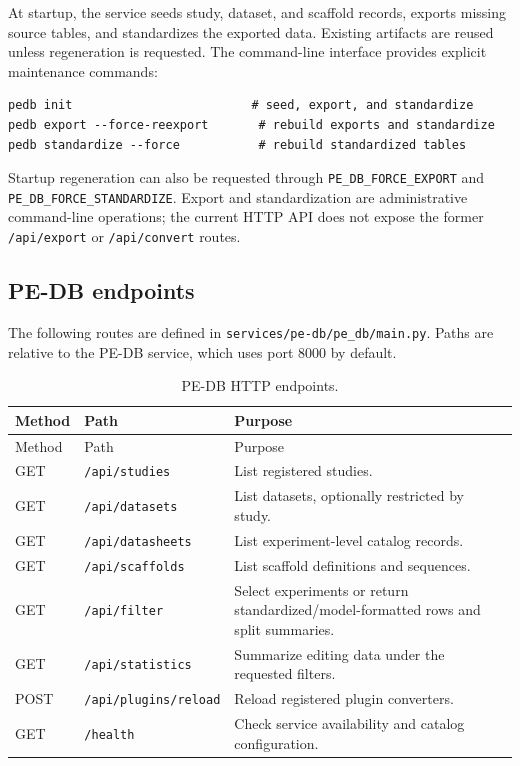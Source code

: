 \documentclass{article}
\begin{document}
At startup, the service seeds study, dataset, and scaffold records, exports missing source tables, and standardizes the exported data. Existing artifacts are reused unless regeneration is requested. The command-line interface provides explicit maintenance commands:

\begin{verbatim}
pedb init                         # seed, export, and standardize
pedb export --force-reexport       # rebuild exports and standardize
pedb standardize --force           # rebuild standardized tables
\end{verbatim}

Startup regeneration can also be requested through \nolinkurl{PE_DB_FORCE_EXPORT} and \nolinkurl{PE_DB_FORCE_STANDARDIZE}. Export and standardization are administrative command-line operations; the current HTTP API does not expose the former \nolinkurl{/api/export} or \nolinkurl{/api/convert} routes.

\subsection{PE-DB endpoints}

The following routes are defined in \nolinkurl{services/pe-db/pe_db/main.py}. Paths are relative to the PE-DB service, which uses port 8000 by default.

\begingroup
\small
\setlength{\tabcolsep}{4pt}
\begin{longtable}{@{}p{}>{\raggedright\arraybackslash}p{}>{\raggedright\arraybackslash}p{}@{}}
    \caption{PE-DB HTTP endpoints.} \label{tab:app-api} \\
    \hline
    Method & Path & Purpose \\
    \hline
    \endfirsthead
    \hline
    Method & Path & Purpose \\
    \hline
    \endhead
    \hline
    \endfoot
    \endlastfoot
    GET & \nolinkurl{/api/studies} & List registered studies. \\
    GET & \nolinkurl{/api/datasets} & List datasets, optionally restricted by study. \\
    GET & \nolinkurl{/api/datasheets} & List experiment-level catalog records. \\
    GET & \nolinkurl{/api/scaffolds} & List scaffold definitions and sequences. \\
    GET & \nolinkurl{/api/filter} & Select experiments or return standardized/model-formatted rows and split summaries. \\
    GET & \nolinkurl{/api/statistics} & Summarize editing data under the requested filters. \\
    POST & \nolinkurl{/api/plugins/reload} & Reload registered plugin converters. \\
    GET & \nolinkurl{/health} & Check service availability and catalog configuration. \\
\end{longtable}
\endgroup
\end{document}
